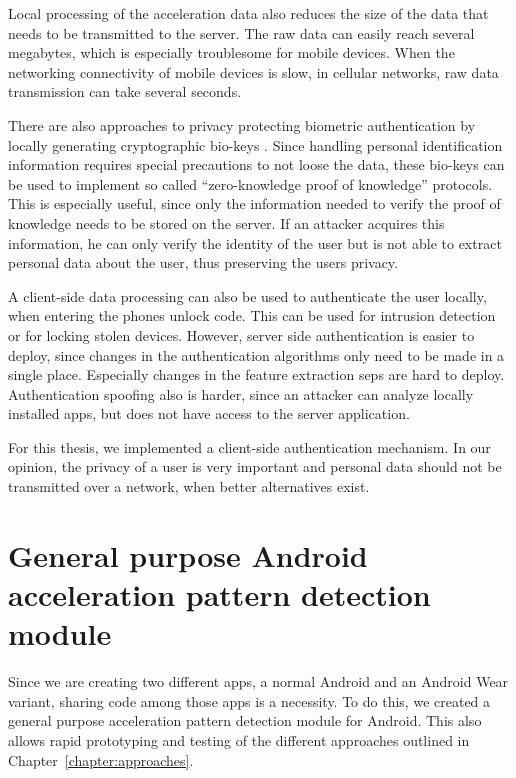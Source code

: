 Local processing of the acceleration data also reduces the size of the data that needs to be transmitted to the server. The raw data can easily reach several megabytes, which is especially troublesome for mobile devices. When the networking connectivity of mobile devices is slow, \eg in cellular networks, raw data transmission can take several seconds.

There are also approaches to privacy protecting biometric authentication by locally generating cryptographic bio-keys \cite{bhargav2006privacy, verbitskiy2003reliable, ross2011visual}. Since handling personal identification information requires special precautions to not loose the data, these bio-keys can be used to implement so called ``zero-knowledge proof of knowledge'' protocols. This is especially useful, since only the information needed to verify the proof of knowledge needs to be stored on the server. If an attacker acquires this information, he can only verify the identity of the user but is not able to extract personal data about the user, thus preserving the users privacy.

A client-side data processing can also be used to authenticate the user locally, \eg when entering the phones unlock code. This can be used for intrusion detection or for locking stolen devices. However, server side authentication is easier to deploy, since changes in the authentication algorithms only need to be made in a single place. Especially changes in the feature extraction seps are hard to deploy. Authentication spoofing also is harder, since an attacker can analyze locally installed apps, but does not have access to the server application.

For this thesis, we implemented a client-side authentication mechanism. In our opinion, the privacy of a user is very important and personal data should not be transmitted over a network, when better alternatives exist.

\section{General purpose Android acceleration pattern detection module}
Since we are creating two different apps, a normal Android and an Android Wear variant, sharing code among those apps is a necessity. To do this, we created a general purpose acceleration pattern detection module for Android. This also allows rapid prototyping and testing of the different approaches outlined in Chapter~\ref{chapter:approaches}.


